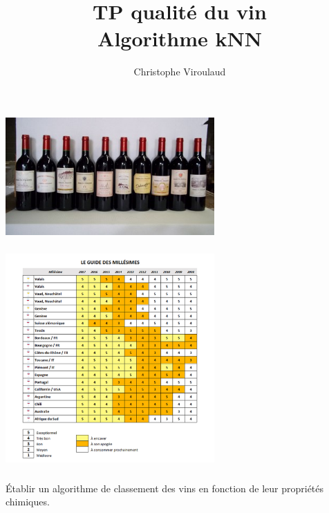 \documentclass[svgnames,11pt]{beamer}
\author[]{Christophe Viroulaud}
\title{TP qualité du vin\\Algorithme kNN}
\date{\framebox{\textbf{Algo 07}}}
\institute{Première - NSI}
\begin{document}
\begin{frame}
\titlepage
\end{frame}
\begin{frame}
    \frametitle{}

    
    \begin{center}
    \centering
    \includegraphics[width=8cm]{ressources/vins.jpg}
    \end{center}

\end{frame}
\begin{frame}
    \frametitle{}

\begin{center}
\centering
\includegraphics[width=8cm]{ressources/classement.jpg}
\label{IMG}
\end{center}
    

\end{frame}
\begin{frame}
    \frametitle{}

    \begin{framed}
        \centering Établir un algorithme de classement des vins en fonction de leur propriétés chimiques.
    \end{framed}

\end{frame}
\end{document}
